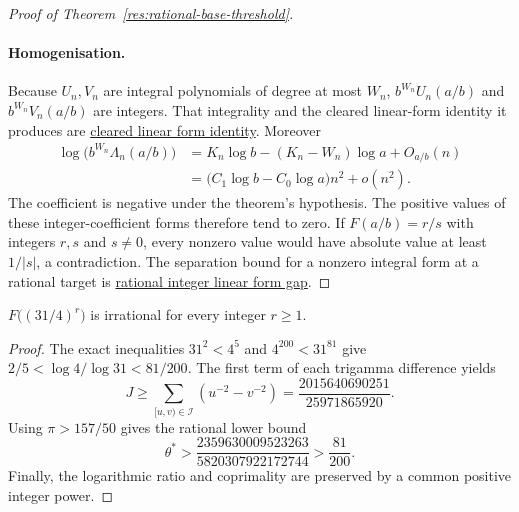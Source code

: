 \documentclass[11pt]{article}
\begin{document}
\begin{proof}[Proof of Theorem~\ref{res:rational-base-threshold}]
\paragraph{Homogenisation.}
Because $U_n,V_n$ are integral polynomials of degree at most $W_n$,
$b^{W_n}U_n(a/b)$ and $b^{W_n}V_n(a/b)$ are integers.
That integrality and the cleared linear-form identity it produces are
\href{https://github.com/wcook04/plectis-erdos/blob/f36a98bf3d3e6f65f1074e3b800e3293d5b8a51a/ErdosProblems/Erdos1049/PaperHomogenisationR7.lean#L61}{cleared linear form identity}.
Moreover
\[
\begin{split}
 \log\bigl(b^{W_n}\Lambda_n(a/b)\bigr)
 &=K_n\log b-(K_n-W_n)\log a+O_{a/b}(n)\\
 &=\bigl(C_1\log b-C_0\log a\bigr)n^2+o(n^2).
\end{split}
\]
The coefficient is negative under the theorem's hypothesis. The positive
values of these integer-coefficient forms therefore tend to zero.
If $F(a/b)=r/s$ with integers $r,s$ and $s\ne0$, every nonzero value
would have absolute value at least $1/|s|$, a contradiction.
The separation bound for a nonzero integral form at a rational target is
\href{https://github.com/wcook04/plectis-erdos/blob/f36a98bf3d3e6f65f1074e3b800e3293d5b8a51a/ErdosProblems/Erdos1049/TwoSelectorRemainderEscape.lean#L128}{rational integer linear form gap}.
\end{proof}

\begin{corollary}\label{res:thirtyone-four}
$F\bigl((31/4)^r\bigr)$ is irrational for every integer $r\ge1$.
\end{corollary}
\begin{proof}
The exact inequalities $31^2<4^5$ and $4^{200}<31^{81}$ give
$2/5<\log4/\log31<81/200$.
The first term of each trigamma difference yields
\[
 J\ge\sum_{[u,v)\in\mathcal I}(u^{-2}-v^{-2})
   =\frac{2015640690251}{25971865920}.
\]
Using $\pi>157/50$ gives the rational lower bound
\[
 \theta^*>\frac{2359630009523263}{5820307922172744}
           >\frac{81}{200}.
\]
Finally, the logarithmic ratio and coprimality are preserved by a common
positive integer power.
\end{proof}
\end{document}
